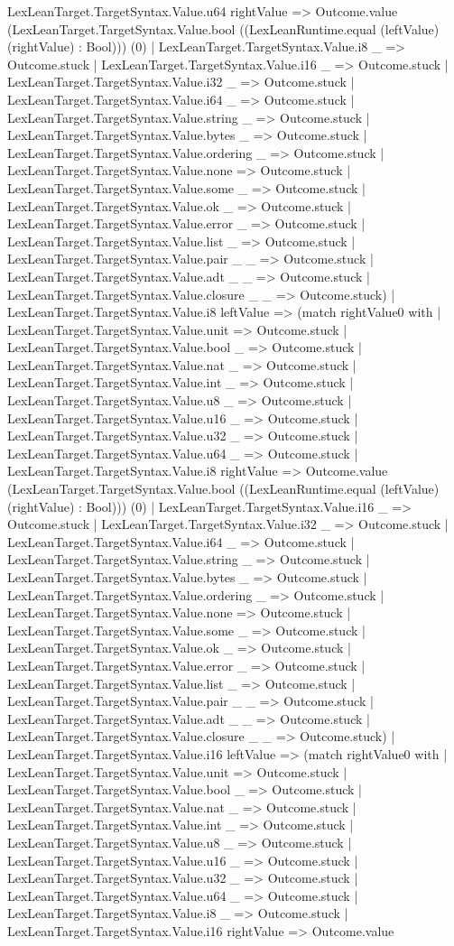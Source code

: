 \documentclass[11pt]{article}
\begin{document}
LexLeanTarget.TargetSyntax.Value.u64 rightValue => Outcome.value (LexLeanTarget.TargetSyntax.Value.bool ((LexLeanRuntime.equal (leftValue) (rightValue) : Bool))) (0) | LexLeanTarget.TargetSyntax.Value.i8 \_ => Outcome.stuck | LexLeanTarget.TargetSyntax.Value.i16 \_ => Outcome.stuck | LexLeanTarget.TargetSyntax.Value.i32 \_ => Outcome.stuck | LexLeanTarget.TargetSyntax.Value.i64 \_ => Outcome.stuck | LexLeanTarget.TargetSyntax.Value.string \_ => Outcome.stuck | LexLeanTarget.TargetSyntax.Value.bytes \_ => Outcome.stuck | LexLeanTarget.TargetSyntax.Value.ordering \_ => Outcome.stuck | LexLeanTarget.TargetSyntax.Value.none => Outcome.stuck | LexLeanTarget.TargetSyntax.Value.some \_ => Outcome.stuck | LexLeanTarget.TargetSyntax.Value.ok \_ => Outcome.stuck | LexLeanTarget.TargetSyntax.Value.error \_ => Outcome.stuck | LexLeanTarget.TargetSyntax.Value.list \_ => Outcome.stuck | LexLeanTarget.TargetSyntax.Value.pair \_ \_ => Outcome.stuck | LexLeanTarget.TargetSyntax.Value.adt \_ \_ => Outcome.stuck | LexLeanTarget.TargetSyntax.Value.closure \_ \_ => Outcome.stuck) | LexLeanTarget.TargetSyntax.Value.i8 leftValue => (match rightValue0 with | LexLeanTarget.TargetSyntax.Value.unit => Outcome.stuck | LexLeanTarget.TargetSyntax.Value.bool \_ => Outcome.stuck | LexLeanTarget.TargetSyntax.Value.nat \_ => Outcome.stuck | LexLeanTarget.TargetSyntax.Value.int \_ => Outcome.stuck | LexLeanTarget.TargetSyntax.Value.u8 \_ => Outcome.stuck | LexLeanTarget.TargetSyntax.Value.u16 \_ => Outcome.stuck | LexLeanTarget.TargetSyntax.Value.u32 \_ => Outcome.stuck | LexLeanTarget.TargetSyntax.Value.u64 \_ => Outcome.stuck | LexLeanTarget.TargetSyntax.Value.i8 rightValue => Outcome.value (LexLeanTarget.TargetSyntax.Value.bool ((LexLeanRuntime.equal (leftValue) (rightValue) : Bool))) (0) | LexLeanTarget.TargetSyntax.Value.i16 \_ => Outcome.stuck | LexLeanTarget.TargetSyntax.Value.i32 \_ => Outcome.stuck | LexLeanTarget.TargetSyntax.Value.i64 \_ => Outcome.stuck | LexLeanTarget.TargetSyntax.Value.string \_ => Outcome.stuck | LexLeanTarget.TargetSyntax.Value.bytes \_ => Outcome.stuck | LexLeanTarget.TargetSyntax.Value.ordering \_ => Outcome.stuck | LexLeanTarget.TargetSyntax.Value.none => Outcome.stuck | LexLeanTarget.TargetSyntax.Value.some \_ => Outcome.stuck | LexLeanTarget.TargetSyntax.Value.ok \_ => Outcome.stuck | LexLeanTarget.TargetSyntax.Value.error \_ => Outcome.stuck | LexLeanTarget.TargetSyntax.Value.list \_ => Outcome.stuck | LexLeanTarget.TargetSyntax.Value.pair \_ \_ => Outcome.stuck | LexLeanTarget.TargetSyntax.Value.adt \_ \_ => Outcome.stuck | LexLeanTarget.TargetSyntax.Value.closure \_ \_ => Outcome.stuck) | LexLeanTarget.TargetSyntax.Value.i16 leftValue => (match rightValue0 with | LexLeanTarget.TargetSyntax.Value.unit => Outcome.stuck | LexLeanTarget.TargetSyntax.Value.bool \_ => Outcome.stuck | LexLeanTarget.TargetSyntax.Value.nat \_ => Outcome.stuck | LexLeanTarget.TargetSyntax.Value.int \_ => Outcome.stuck | LexLeanTarget.TargetSyntax.Value.u8 \_ => Outcome.stuck | LexLeanTarget.TargetSyntax.Value.u16 \_ => Outcome.stuck | LexLeanTarget.TargetSyntax.Value.u32 \_ => Outcome.stuck | LexLeanTarget.TargetSyntax.Value.u64 \_ => Outcome.stuck | LexLeanTarget.TargetSyntax.Value.i8 \_ => Outcome.stuck | LexLeanTarget.TargetSyntax.Value.i16 rightValue => Outcome.value 
\end{document}
